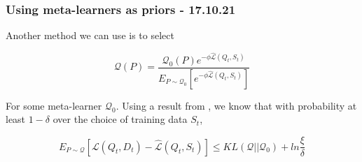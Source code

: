 \documentclass[letterpaper]{article}
\theoremstyle{definition}
\begin{document}
%
%
%
%
%
%
%
%

\subsubsection{Using meta-learners as priors - 17.10.21}

Another method we can use is to select 

$$ \mathcal{Q}(P) = \frac{\mathcal{Q}_0(P)e^{-\phi \hat{\mathcal{L}}(Q_t, S_t)}}{E_{P\sim \mathcal{Q}_0} \left [e^{-\phi \hat{\mathcal{L}}(Q_t, S_t)}\right ]}$$

For some meta-learner $\mathcal{Q}_0$.
Using a result from \cite{Rivasplata2020}, we know that with probability at least $1-\delta$ over the choice of training data $S_t$,

$$ E_{P\sim \mathcal{Q}} \left [\mathcal{L}(Q_t, D_t) - \hat{\mathcal{L}}(Q_t, S_t) \right ] \leq KL(\mathcal{Q}||\mathcal{Q}_0) + ln\frac{\xi}{\delta} $$
\end{document}

